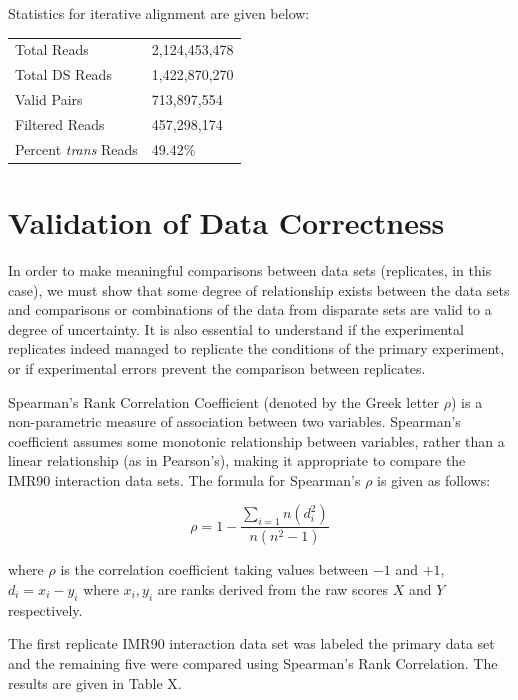 \documentclass[phd,tocprelim]{cornell}
\begin{document}
Statistics for iterative alignment are given below:

\begin{center}
  \begin{table}
    \begin{tabular}{l l}
    Total Reads & 2,124,453,478 \\
    Total DS Reads & 1,422,870,270 \\
    Valid Pairs & 713,897,554 \\
    Filtered Reads & 457,298,174 \\
    Percent \textit{trans} Reads & 49.42\% \\
    \end{tabular}
  \end{table}
\end{center}


\chapter{Validation of Data Correctness}

In order to make meaningful comparisons between data sets (replicates,
in this case), we must show that some degree of relationship exists between
the data sets and comparisons or combinations of the data from disparate sets
are valid to a degree of uncertainty.  It is also essential to understand if the
experimental replicates indeed managed to replicate the conditions of the primary
experiment, or if experimental errors prevent the comparison between replicates.

Spearman's Rank Correlation Coefficient (denoted by the Greek letter $\rho$) is
a non-parametric measure of association between two variables.
Spearman's coefficient assumes some monotonic relationship between variables,
rather than a linear relationship (as in Pearson's), making it appropriate
to compare the IMR90 interaction data sets.  The formula for Spearman's $\rho$ is
given as follows:

\begin{equation}
\rho = 1 - \frac{\sum_{i=1}{n}(d_i^2)}{n(n^2 - 1)}
\end{equation}

where $\rho$ is the correlation coefficient taking values between $-1$ and $+1$,
$d_i = x_i - y_i$ where $x_i, y_i$ are ranks derived from the raw scores $X$ and
$Y$ respectively.

The first replicate IMR90 interaction data set was labeled the primary data set
and the remaining five were compared using Spearman's Rank Correlation.  The
results are given in Table X.
\end{document}
